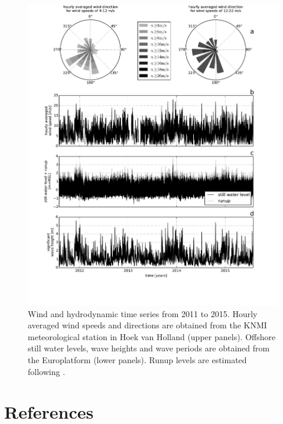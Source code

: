 \documentclass[preprint,12pt,authoryear]{elsarticle}
\begin{document}
\begin{figure}
  \centering
  \includegraphics[width=\columnwidth]{../Figures/boundaryconditions}
  \caption{Wind and hydrodynamic time series from 2011 to 2015. Hourly
    averaged wind speeds and directions are obtained from the KNMI
    meteorological station in Hoek van Holland (upper
    panels). Offshore still water levels, wave heights and wave
    periods are obtained from the Europlatform (lower panels). Runup
    levels are estimated following \citet{Stockdon2006}.}
  \label{fig:windwaves}
\end{figure}

\appendix



\section*{References}
{}
\end{document}
